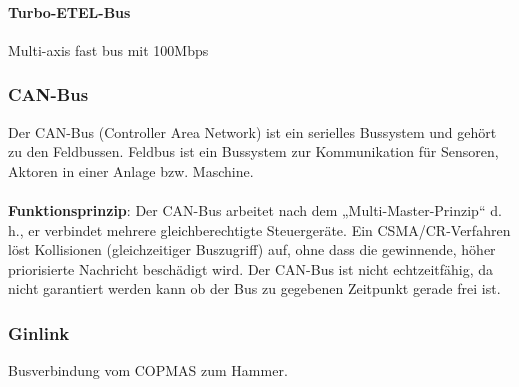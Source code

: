 			\paragraph{Turbo-ETEL-Bus}
				Multi-axis fast bus mit 100Mbps
		\subsubsection{CAN-Bus}
			Der CAN-Bus (Controller Area Network) ist ein serielles Bussystem und gehört zu den Feldbussen. Feldbus ist ein Bussystem zur Kommunikation für Sensoren, Aktoren in einer Anlage bzw. Maschine.\\\\
			\textbf{Funktionsprinzip}: Der CAN-Bus arbeitet nach dem „Multi-Master-Prinzip“ d. h., er verbindet mehrere gleichberechtigte Steuergeräte. Ein CSMA/CR-Verfahren löst Kollisionen (gleichzeitiger Buszugriff) auf, ohne dass die gewinnende, höher priorisierte Nachricht beschädigt wird. Der CAN-Bus ist nicht echtzeitfähig, da nicht garantiert werden kann ob der Bus zu gegebenen Zeitpunkt gerade frei ist.
		\subsubsection{Ginlink}
			Busverbindung vom COPMAS zum Hammer.